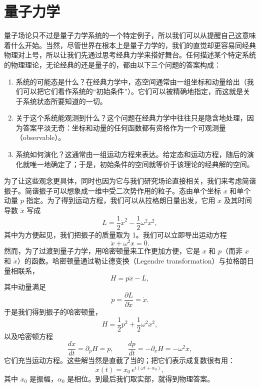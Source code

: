 \section{量子力学}

量子场论只不过是量子力学系统的一个特定例子，所以我们可以从提醒自己这意味着什么开始。当然，尽管世界在根本上是量子力学的，我们的直觉却更容易同经典物理对上号，所以让我们先通过思考经典力学来搭好舞台。任何描述某个特定系统的物理理论，无论经典的还是量子的，都由以下三个问题的答案构成：

\begin{enumerate}
\item 系统的可能态是什么？在经典力学中，态空间通常由一组坐标和动量给出（我们可以把它们看作系统的“初始条件”）。它们可以被精确地指定，而这就是关于系统状态所要知道的一切。
\item 关于这个系统能观测到什么？这个问题在经典力学中往往只是隐含地处理，因为答案平淡无奇：坐标和动量的任何函数都有资格作为一个可观测量（observable）。
\item 系统如何演化？这通常由一组运动方程来表达。给定态和运动方程，随后的演化就唯一地确定了；于是，初始条件的空间就等价于该理论的经典解的空间。
\end{enumerate}

为了让这些观念更具体，同时也因为它与我们研究场论直接相关，我们来考虑简谐振子。简谐振子可以想象成一维中受二次势作用的粒子。态由单个坐标 $x$ 和单个动量 $p$ 指定。为了得到运动方程，我们可以从拉格朗日量出发，它用 $x$ 及其时间导数 $\dot{x}$ 写成
\begin{equation*}
L = \frac{1}{2}\dot{x}^2 - \frac{1}{2}\omega^2 x^2,
\tag{9.3}
\end{equation*}
其中为方便起见，我们把振子的质量取为 1。我们可以立即导出运动方程
\begin{equation*}
\ddot{x} + \omega^2 x = 0.
\tag{9.4}
\end{equation*}
然而，为了过渡到量子力学，用哈密顿量来工作更加方便，它是 $x$ 和 $p$（而非 $x$ 和 $\dot{x}$）的函数。哈密顿量通过勒让德变换（Legendre transformation）与拉格朗日量相联系，
\begin{equation*}
H = p\dot{x} - L,
\tag{9.5}
\end{equation*}
其中动量满足
\begin{equation*}
p = \frac{\partial L}{\partial \dot{x}} = \dot{x}.
\tag{9.6}
\end{equation*}
于是我们得到振子的哈密顿量，
\begin{equation*}
H = \frac{1}{2}p^2 + \frac{1}{2}\omega^2 x^2,
\tag{9.7}
\end{equation*}
以及哈密顿方程
\begin{equation*}
\frac{dx}{dt} = \partial_p H = p, \qquad \frac{dp}{dt} = -\partial_x H = -\omega^2 x,
\tag{9.8}
\end{equation*}
它们充当运动方程。这些解当然是直截了当的；把它们表示成复数很有用：
\begin{equation*}
x(t) = x_0\, e^{i(\omega t + \alpha_0)},
\tag{9.9}
\end{equation*}
其中 $x_0$ 是振幅，$\alpha_0$ 是相位。到最后我们取实部，就得到物理答案。

